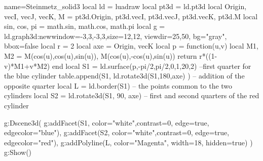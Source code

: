 \documentclass[border=5pt,tikz]{standalone}%
\begin{document}
\begin{luadraw}{name=Steinmetz_solid3}
local ld = luadraw
local pt3d = ld.pt3d
local Origin, vecI, vecJ, vecK, M = pt3d.Origin, pt3d.vecI, pt3d.vecJ, pt3d.vecK, pt3d.M
local sin, cos, pi = math.sin, math.cos, math.pi
local g = ld.graph3d:new{window={-3,3,-3,3},size={12,12}, 
    viewdir={25,50}, bg="gray", bbox=false}
local r = 2
local axe = {Origin, vecK}
local p = function(u,v) 
    local M1, M2 = M(cos(u),cos(u),sin(u)), M(cos(u),-cos(u),sin(u))
    return r*((1-v)*M1+v*M2)
end
local S1 = ld.surface(p,-pi/2,pi/2,0,1,{20,2}) --first quarter for the blue cylinder 
table.append(S1, ld.rotate3d(S1,180,axe) ) -- addition of the opposite quarter
local L = ld.border(S1) -- the points common to the two cylinders
local S2 = ld.rotate3d(S1, 90, axe) -- first and second quarters of the red cylinder

g:Dscene3d( 
    g:addFacet(S1, {color="white",contrast=0, edge=true, edgecolor="blue"}),
    g:addFacet(S2, {color="white",contrast=0, edge=true, edgecolor="red"}),
    g:addPolyline(L, {color="Magenta", width=18, hidden=true})
    )
g:Show()
\end{luadraw}
\end{document}
